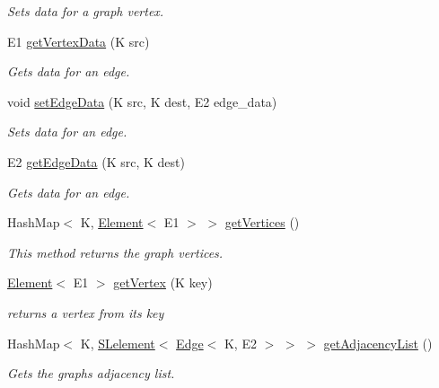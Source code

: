 \begin{DoxyCompactItemize}
\begin{DoxyCompactList}\small\item\em Sets data for a graph vertex. \end{DoxyCompactList}\item 
E1 \hyperlink{classbridges_1_1base_1_1_graph_adj_list_a3d5f73795bcd5011c425eaca33383454}{get\+Vertex\+Data} (K src)
\begin{DoxyCompactList}\small\item\em Gets data for an edge. \end{DoxyCompactList}\item 
void \hyperlink{classbridges_1_1base_1_1_graph_adj_list_a48041b13b10d5fb677f48a0debfc268e}{set\+Edge\+Data} (K src, K dest, E2 edge\+\_\+data)
\begin{DoxyCompactList}\small\item\em Sets data for an edge. \end{DoxyCompactList}\item 
E2 \hyperlink{classbridges_1_1base_1_1_graph_adj_list_a13cdc7ed89fb211f47e2b04da0b65561}{get\+Edge\+Data} (K src, K dest)
\begin{DoxyCompactList}\small\item\em Gets data for an edge. \end{DoxyCompactList}\item 
Hash\+Map$<$ K, \hyperlink{classbridges_1_1base_1_1_element}{Element}$<$ E1 $>$ $>$ \hyperlink{classbridges_1_1base_1_1_graph_adj_list_acd53b2393db0936ad5812997f67ee1ee}{get\+Vertices} ()
\begin{DoxyCompactList}\small\item\em This method returns the graph vertices. \end{DoxyCompactList}\item 
\hyperlink{classbridges_1_1base_1_1_element}{Element}$<$ E1 $>$ \hyperlink{classbridges_1_1base_1_1_graph_adj_list_aa19cd300a85b05352bdf58720310a112}{get\+Vertex} (K key)
\begin{DoxyCompactList}\small\item\em returns a vertex from its key \end{DoxyCompactList}\item 
Hash\+Map$<$ K, \hyperlink{classbridges_1_1base_1_1_s_lelement}{S\+Lelement}$<$ \hyperlink{classbridges_1_1base_1_1_edge}{Edge}$<$ K, E2 $>$ $>$ $>$ \hyperlink{classbridges_1_1base_1_1_graph_adj_list_a77771e356aa8bf44525be9ae01603989}{get\+Adjacency\+List} ()
\begin{DoxyCompactList}\small\item\em Gets the graph\textquotesingle{}s adjacency list. \end{DoxyCompactList}\item 

\end{DoxyCompactItemize}

